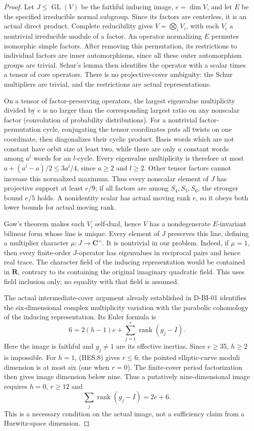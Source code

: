 \begin{proof}
Let $J\le\operatorname{GL}(V)$ be the faithful inducing image, $e=\dim V$,
and let $E$ be the specified irreducible normal subgroup. Since its factors
are centerless, it is an actual direct product. Complete reducibility gives
$V=\bigotimes_i V_i$, with each $V_i$ a nontrivial irreducible module of a
factor. An operator normalizing $E$ permutes isomorphic simple factors.
After removing this permutation, its restrictions to individual factors
are inner automorphisms, since all these outer automorphism groups are
trivial. Schur's lemma then identifies the operator with a scalar times a
tensor of core operators. There is no projective-cover ambiguity: the Schur
multipliers are trivial, and the restrictions are actual representations.

On a tensor of factor-preserving operators, the largest eigenvalue
multiplicity divided by $e$ is no larger than the corresponding largest
ratio on any nonscalar factor (convolution of probability distributions).
For a nontrivial factor-permutation cycle, conjugating the tensor coordinates
puts all twists on one coordinate, then diagonalizes their cyclic product.
Basis words which are not constant have orbit size at least two, while
there are only $a$ constant words among $a^l$ words for an $l$-cycle.
Every eigenvalue multiplicity is therefore at most
$a+(a^l-a)/2\le3a^l/4$, since $a\ge2$ and $l\ge2$.
Other tensor factors cannot increase this normalized maximum. Thus every
nonscalar element of $J$ has projective support at least $e/9$; if all factors
are among $S_4,S_5,S_6$, the stronger bound $e/5$ holds. A nonidentity scalar has actual
moving rank $e$, so it obeys both lower bounds for actual moving rank.

Gow's theorem makes each $V_i$ self-dual, hence $V$ has a nondegenerate
$E$-invariant bilinear form whose line is unique. Every element of $J$
preserves this line, defining a multiplier character
$\mu:J\to\mathbf C^\times$. It is nontrivial in our problem. Indeed, if
$\mu=1$, then every finite-order $J$-operator has eigenvalues in reciprocal
pairs and hence real trace. The character field of the inducing
representation would be contained in $\mathbf R$, contrary to its containing
the original imaginary quadratic field. This uses field inclusion only;
no equality with that field is assumed.

The actual intermediate-cover argument already established in D-BI-01
identifies the six-dimensional complex multiplicity variation with the
parabolic cohomology of the inducing representation. Its Euler formula is
\[
                 6=2(h-1)e+\sum_{j=1}^r\operatorname{rank}(g_j-I).
\tag{HES.8}
\]
Here the image is faithful and $g_j\ne1$ are its effective inertias.
Since $e\ge35$, $h\ge2$ is impossible. For $h=1$, (HES.8) gives $r\le6$;
the pointed elliptic-curve moduli dimension is at most six (one when $r=0$).
The finite-cover period factorization then gives image dimension below nine.
Thus a putatively nine-dimensional image requires $h=0$, $r\ge12$ and
\[
                  \sum_j\operatorname{rank}(g_j-I)=2e+6.
\tag{HES.9}
\]
This is a necessary condition on the actual image, not a sufficiency claim
from a Hurwitz-space dimension.


\end{proof}
